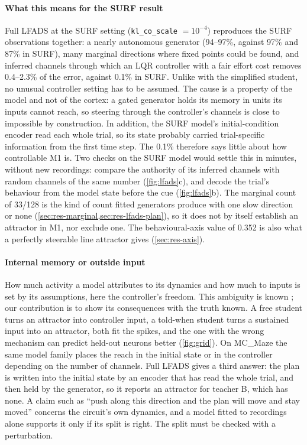 \documentclass[11pt,a4paper]{article}
\newcommand{\kl}{\texttt{kl\_co\_scale}}
\begin{document}
\paragraph{What this means for the SURF result} Full LFADS at the SURF setting (\kl{} $=10^{-4}$) reproduces the SURF observations together: a nearly autonomous generator (94--97\%, against 97\% and 87\% in SURF), many marginal directions where fixed points could be found, and inferred channels through which an LQR controller with a fair effort cost removes 0.4--2.3\% of the error, against 0.1\% in SURF. Unlike with the simplified student, no unusual controller setting has to be assumed. The cause is a property of the model and not of the cortex: a gated generator holds its memory in units its inputs cannot reach, so steering through the controller's channels is close to impossible by construction. In addition, the SURF model's initial-condition encoder read each whole trial, so its state probably carried trial-specific information from the first time step. The 0.1\% therefore says little about how controllable M1 is. Two checks on the SURF model would settle this in minutes, without new recordings: compare the authority of its inferred channels with random channels of the same number (\cref{fig:lfads}c), and decode the trial's behaviour from the model state before the cue (\cref{fig:lfads}b). The marginal count of 33/128 is the kind of count fitted generators produce with one slow direction or none (\cref{sec:res-marginal,sec:res-lfads-plan}), so it does not by itself establish an attractor in M1, nor exclude one. The behavioural-axis value of 0.352 is also what a perfectly steerable line attractor gives (\cref{sec:res-axis}).

\paragraph{Internal memory or outside input} How much activity a model attributes to its dynamics and how much to inputs is set by its assumptions, here the controller's freedom. This ambiguity is known \citep{sussillo2016,malonis2026,versteeg2025}; our contribution is to show its consequences with the truth known. A free student turns an attractor into controller input, a told-when student turns a sustained input into an attractor, both fit the spikes, and the one with the wrong mechanism can predict held-out neurons better (\cref{fig:grid}). On MC\_Maze the same model family places the reach in the initial state or in the controller depending on the number of channels. Full LFADS gives a third answer: the plan is written into the initial state by an encoder that has read the whole trial, and then held by the generator, so it reports an attractor for teacher B, which has none. A claim such as ``push along this direction and the plan will move and stay moved'' concerns the circuit's own dynamics, and a model fitted to recordings alone supports it only if its split is right. The split must be checked with a perturbation.
\end{document}
